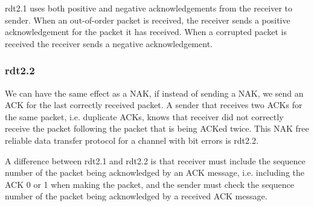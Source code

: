 \documentclass[12pt letter]{report}
\begin{document}
rdt2.1 uses both positive and negative acknowledgements from the
receiver to sender. When an out-of-order packet is received, the
receiver sends a positive acknowledgement for the packet it has
received. When a corrupted packet is received the receiver sends a
negative acknowledgement.

\subsubsection{rdt2.2}

We can have the same effect as a NAK, if instead of sending a NAK,
we send an ACK for the last correctly received packet. A sender that
receives two ACKs for the same packet, i.e. duplicate ACKs, knows
that receiver did not correctly receive the packet following the packet
that is being ACKed twice. This NAK free reliable data transfer protocol
for a channel with bit errors is rdt2.2.

A difference between rdt2.1 and rdt2.2 is that receiver must include
the sequence number of the packet being acknowledged by an ACK
message, i.e. including the ACK 0 or 1 when making the packet, and
the sender must check the sequence number of the packet being
acknowledged by a received ACK message.
\end{document}
